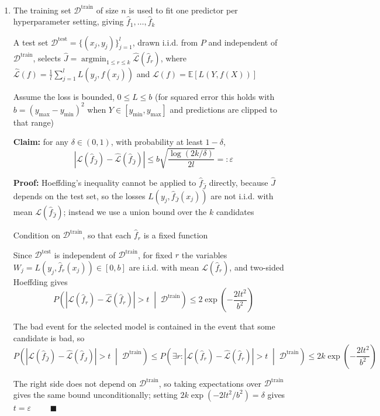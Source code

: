 \documentclass{article}
\begin{document}
\begin{enumerate}[label=\alph*.]
\item The training set $\mathcal D^{\mathrm{train}}$ of size $n$ is used to fit one predictor per hyperparameter setting, giving $\hat f_1,\ldots,\hat f_k$

A test set $\mathcal D^{\mathrm{test}}=\{(x_j,y_j)\}_{j=1}^l$, drawn i.i.d. from $P$ and independent of $\mathcal D^{\mathrm{train}}$, selects $\hat J=\operatorname*{argmin}_{1\leq r\leq k}\hat{\mathcal L}(\hat f_r)$, where $\hat{\mathcal L}(f)=\frac{1}{l}\sum_{j=1}^lL(y_j,f(x_j))$ and $\mathcal L(f)=\mathbb E[L(Y,f(X))]$

Assume the loss is bounded, $0\leq L\leq b$ (for squared error this holds with $b=(y_{\max}-y_{\min})^2$ when $Y\in[y_{\min},y_{\max}]$ and predictions are clipped to that range)

\textbf{Claim:} for any $\delta\in(0,1)$, with probability at least $1-\delta$,
\[\left|\mathcal L(\hat f_{\hat J})-\hat{\mathcal L}(\hat f_{\hat J})\right|\leq b\sqrt{\frac{\log(2k/\delta)}{2l}}=:\varepsilon\]

\textbf{Proof:} Hoeffding's inequality cannot be applied to $\hat f_{\hat J}$ directly, because $\hat J$ depends on the test set, so the losses $L(y_j,\hat f_{\hat J}(x_j))$ are not i.i.d. with mean $\mathcal L(\hat f_{\hat J})$; instead we use a union bound over the $k$ candidates

Condition on $\mathcal D^{\mathrm{train}}$, so that each $\hat f_r$ is a fixed function

Since $\mathcal D^{\mathrm{test}}$ is independent of $\mathcal D^{\mathrm{train}}$, for fixed $r$ the variables $W_j=L(y_j,\hat f_r(x_j))\in[0,b]$ are i.i.d. with mean $\mathcal L(\hat f_r)$, and two-sided Hoeffding gives
\[P\left(\left|\mathcal L(\hat f_r)-\hat{\mathcal L}(\hat f_r)\right|>t\;\middle|\;\mathcal D^{\mathrm{train}}\right)\leq2\exp\left(-\frac{2lt^2}{b^2}\right)\]

The bad event for the selected model is contained in the event that some candidate is bad, so
\[P\left(\left|\mathcal L(\hat f_{\hat J})-\hat{\mathcal L}(\hat f_{\hat J})\right|>t\;\middle|\;\mathcal D^{\mathrm{train}}\right)\leq P\left(\exists r:\left|\mathcal L(\hat f_r)-\hat{\mathcal L}(\hat f_r)\right|>t\;\middle|\;\mathcal D^{\mathrm{train}}\right)\leq2k\exp\left(-\frac{2lt^2}{b^2}\right)\]

The right side does not depend on $\mathcal D^{\mathrm{train}}$, so taking expectations over $\mathcal D^{\mathrm{train}}$ gives the same bound unconditionally; setting $2k\exp(-2lt^2/b^2)=\delta$ gives $t=\varepsilon$ $\qquad\blacksquare$


\end{enumerate}
\end{document}

